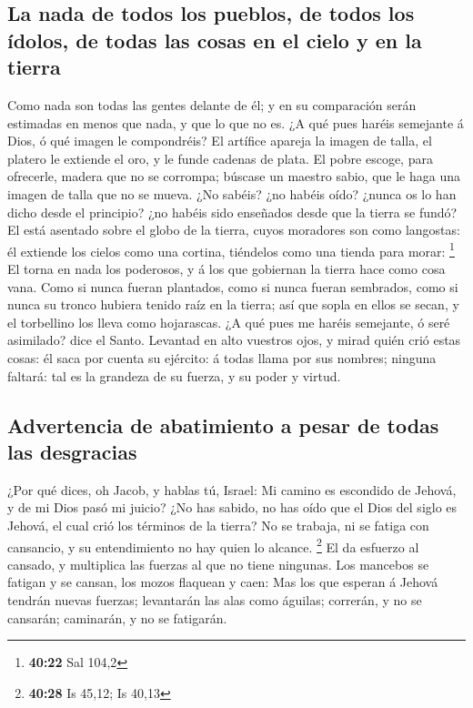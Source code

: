 \hypertarget{la-nada-de-todos-los-pueblos-de-todos-los-uxeddolos-de-todas-las-cosas-en-el-cielo-y-en-la-tierra}{%
\subsection{La nada de todos los pueblos, de todos los ídolos, de todas
las cosas en el cielo y en la
tierra}\label{la-nada-de-todos-los-pueblos-de-todos-los-uxeddolos-de-todas-las-cosas-en-el-cielo-y-en-la-tierra}}

 Como nada son todas las gentes delante de él; y en su
comparación serán estimadas en menos que nada, y que lo que no es.
 ¿A qué pues haréis semejante á Dios, ó qué imagen le
compondréis?  El artífice apareja la imagen de talla, el
platero le extiende el oro, y le funde cadenas de plata. 
El pobre escoge, para ofrecerle, madera que no se corrompa; búscase un
maestro sabio, que le haga una imagen de talla que no se mueva.
 ¿No sabéis? ¿no habéis oído? ¿nunca os lo han dicho desde
el principio? ¿no habéis sido enseñados desde que la tierra se fundó?
 El está asentado sobre el globo de la tierra, cuyos
moradores son como langostas: él extiende los cielos como una cortina,
tiéndelos como una tienda para morar: \footnote{\textbf{40:22} Sal 104,2}
 El torna en nada los poderosos, y á los que gobiernan la
tierra hace como cosa vana.  Como si nunca fueran
plantados, como si nunca fueran sembrados, como si nunca su tronco
hubiera tenido raíz en la tierra; así que sopla en ellos se secan, y el
torbellino los lleva como hojarascas.  ¿A qué pues me
haréis semejante, ó seré asimilado? dice el Santo. 
Levantad en alto vuestros ojos, y mirad quién crió estas cosas: él saca
por cuenta su ejército: á todas llama por sus nombres; ninguna faltará:
tal es la grandeza de su fuerza, y su poder y virtud.

\hypertarget{advertencia-de-abatimiento-a-pesar-de-todas-las-desgracias}{%
\subsection{Advertencia de abatimiento a pesar de todas las
desgracias}\label{advertencia-de-abatimiento-a-pesar-de-todas-las-desgracias}}

 ¿Por qué dices, oh Jacob, y hablas tú, Israel: Mi camino
es escondido de Jehová, y de mi Dios pasó mi juicio?  ¿No
has sabido, no has oído que el Dios del siglo es Jehová, el cual crió
los términos de la tierra? No se trabaja, ni se fatiga con cansancio, y
su entendimiento no hay quien lo alcance. \footnote{\textbf{40:28} Is
  45,12; Is 40,13}  El da esfuerzo al cansado, y multiplica
las fuerzas al que no tiene ningunas.  Los mancebos se
fatigan y se cansan, los mozos flaquean y caen:  Mas los
que esperan á Jehová tendrán nuevas fuerzas; levantarán las alas como
águilas; correrán, y no se cansarán; caminarán, y no se fatigarán.


